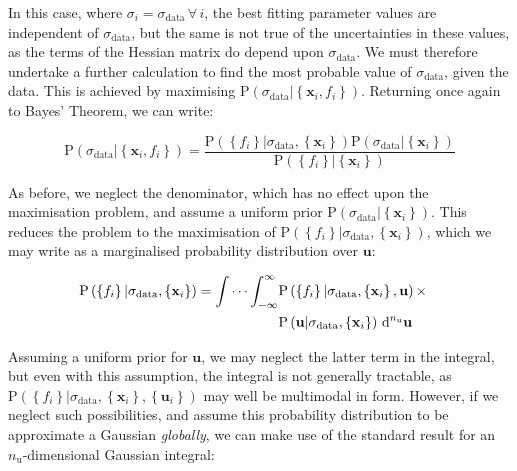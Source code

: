 \documentclass[a4paper,onecolumn,11pt]{book}
\begin{document}
In this case, where $\sigma_i = \sigma_\mathrm{data} \,\forall\, i$, the best
fitting parameter values are independent of $\sigma_\mathrm{data}$, but the
same is not true of the uncertainties in these values, as the terms of the
Hessian matrix do depend upon $\sigma_\mathrm{data}$. We must therefore
undertake a further calculation to find the most probable value of
$\sigma_\mathrm{data}$, given the data. This is achieved by maximising
$\mathrm{P}\left( \sigma_\mathrm{data} | \left\{ \mathbf{x}_i, f_i \right\}
\right)$. Returning once again to Bayes' Theorem, we can write:

\begin{equation}
\mathrm{P}\left( \sigma_\mathrm{data} | \left\{ \mathbf{x}_i, f_i \right\} \right)
= \frac{
\mathrm{P}\left( \left\{ f_i \right\} | \sigma_\mathrm{data}, \left\{ \mathbf{x}_i \right\} \right)
\mathrm{P}\left( \sigma_\mathrm{data} | \left\{ \mathbf{x}_i \right\} \right)
}{
\mathrm{P}\left( \left\{ f_i \right\} | \left\{ \mathbf{x}_i \right\} \right)
}
\end{equation}

As before, we neglect the denominator, which has no effect upon the
maximisation problem, and assume a uniform prior $\mathrm{P}\left(
\sigma_\mathrm{data} | \left\{ \mathbf{x}_i \right\} \right)$. This reduces the
problem to the maximisation of $\mathrm{P}\left( \left\{ f_i \right\} |
\sigma_\mathrm{data}, \left\{ \mathbf{x}_i \right\} \right)$, which we may
write as a marginalised probability distribution over $\mathbf{u}$:

\begin{eqnarray}
\label{p_f_given_sigma}
\mathrm{P}\left( \left\{ f_i \right\} | \sigma_\mathrm{data}, \left\{ \mathbf{x}_i \right\} \right) =
\idotsint_{-\infty}^{\infty}
&
\mathrm{P}\left( \left\{ f_i \right\} | \sigma_\mathrm{data}, \left\{ \mathbf{x}_i \right\}, \mathbf{u} \right)
\times & \\ &
\mathrm{P}\left( \mathbf{u} | \sigma_\mathrm{data}, \left\{ \mathbf{x}_i \right\} \right)
\,\mathrm{d}^{n_\mathrm{u}}\mathbf{u}
& \nonumber
\end{eqnarray}

Assuming a uniform prior for $\mathbf{u}$, we may neglect the latter term in
the integral, but even with this assumption, the integral is not generally
tractable, as $\mathrm{P}\left( \left\{ f_i \right\} | \sigma_\mathrm{data},
\left\{ \mathbf{x}_i \right\}, \left\{ \mathbf{u}_i \right\} \right)$ may well
be multimodal in form. However, if we neglect such possibilities, and assume
this probability distribution to be approximate a Gaussian \textit{globally},
we can make use of the standard result for an $n_\mathrm{u}$-dimensional Gaussian integral:
\end{document}

